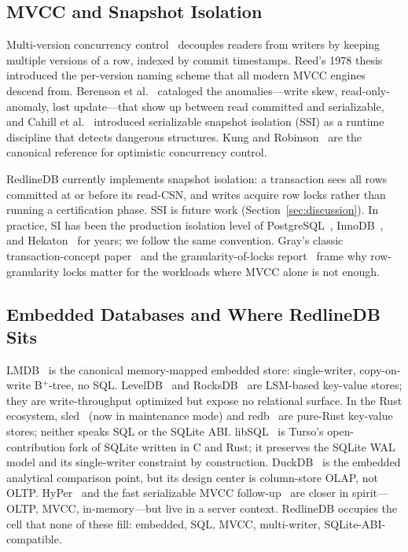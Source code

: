 \subsection{MVCC and Snapshot Isolation}
Multi-version concurrency control~\cite{bernstein1983mvcc} decouples
readers from writers by keeping multiple versions of a row, indexed by
commit timestamps. Reed's 1978 thesis~\cite{reed1978naming} introduced
the per-version naming scheme that all modern MVCC engines descend from.
Berenson et al.~\cite{berenson1995ansi} cataloged the anomalies---write
skew, read-only-anomaly, lost update---that show up between read
committed and serializable, and Cahill et
al.~\cite{cahill2008ssi} introduced serializable snapshot isolation
(SSI) as a runtime discipline that detects dangerous structures. Kung
and Robinson~\cite{kung1981occ} are the canonical reference for
optimistic concurrency control.

RedlineDB currently implements snapshot isolation: a transaction sees
all rows committed at or before its read-CSN, and writes acquire row
locks rather than running a certification phase. SSI is future work
(Section~\ref{sec:discussion}). In practice, SI has been the production
isolation level of PostgreSQL~\cite{postgresql_mvcc,stonebraker1987postgres},
InnoDB~\cite{innodb_mvcc}, and Hekaton~\cite{diaconu2013hekaton} for
years; we follow the same convention. Gray's classic transaction-concept
paper~\cite{gray1981transaction} and the granularity-of-locks
report~\cite{gray1976granularity} frame why row-granularity locks
matter for the workloads where MVCC alone is not enough.

\subsection{Embedded Databases and Where RedlineDB Sits}
LMDB~\cite{chu2011lmdb} is the canonical memory-mapped embedded store:
single-writer, copy-on-write B$^+$-tree, no SQL. LevelDB~\cite{leveldb}
and RocksDB~\cite{rocksdb} are LSM-based key-value stores; they are
write-throughput optimized but expose no relational surface. In the
Rust ecosystem, sled~\cite{sled} (now in maintenance mode) and
redb~\cite{redb} are pure-Rust key-value stores; neither speaks SQL or
the SQLite ABI. libSQL~\cite{libsql} is Turso's open-contribution fork
of SQLite written in C and Rust; it preserves the SQLite WAL model and
its single-writer constraint by construction. DuckDB~\cite{raasveldt2019duckdb}
is the embedded analytical comparison point, but its design center is
column-store OLAP, not OLTP. HyPer~\cite{kemper2011hyper} and the fast
serializable MVCC follow-up~\cite{neumann2015fast} are closer in
spirit---OLTP, MVCC, in-memory---but live in a server context. RedlineDB
occupies the cell that none of these fill: embedded, SQL, MVCC,
multi-writer, SQLite-ABI-compatible.

